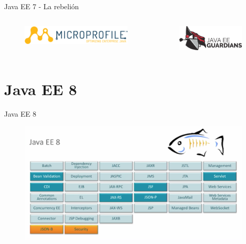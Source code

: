 \documentclass{beamer}
\begin{document}
\begin{frame}{Java EE 7 - La rebelión}
\begin{columns}
\begin{column}{0.5\textwidth}
\begin{figure}
\centering
\includegraphics[width=\linewidth]{Images/microprofile-logo}
\end{figure}
\end{column}
\begin{column}{0.5\textwidth}  %
\begin{figure}
\centering
\includegraphics[width=\linewidth]{Images/guardians}
\end{figure}
\end{column}
\end{columns}
\end{frame}


\section{Java EE 8}
\begin{frame}{Java EE 8}
\begin{figure}
	\centering
	\includegraphics[width=\linewidth]{Images/javaee8}
\end{figure}
\end{frame}
\end{document}
